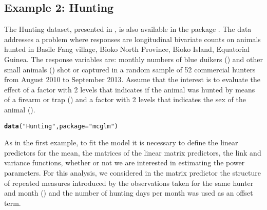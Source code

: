 \documentclass[article]{jss}\usepackage[]{graphicx}\usepackage[]{xcolor}
\makeatletter
\newcommand{\hlstr}[1]{\textcolor[rgb]{0.192,0.494,0.8}{#1}}%
\newcommand{\hlstd}[1]{\textcolor[rgb]{0.345,0.345,0.345}{#1}}%
\newcommand{\hlkwc}[1]{\textcolor[rgb]{0.333,0.667,0.333}{#1}}%
\newcommand{\hlkwd}[1]{\textcolor[rgb]{0.737,0.353,0.396}{\textbf{#1}}}%
\newenvironment{kframe}{%
 \def\at@end@of@kframe{}%
 \ifinner\ifhmode%
  \def\at@end@of@kframe{\end{minipage}}%
  \begin{minipage}{\columnwidth}%
 \fi\fi%
 \def\FrameCommand##1{\hskip\@totalleftmargin \hskip-\fboxsep
 \colorbox{shadecolor}{##1}\hskip-\fboxsep
     \hskip-\linewidth \hskip-\@totalleftmargin \hskip\columnwidth}%
 \MakeFramed {\advance\hsize-\width
   \@totalleftmargin\z@ \linewidth\hsize
   \@setminipage}}%
 {\par\unskip\endMakeFramed%
 \at@end@of@kframe}
\newenvironment{knitrout}{}{} %
\makeatother
\begin{document}
\subsection{Example 2: Hunting}

The Hunting dataset, presented in \citet{hunting}, is also available in the package . The data addresses a problem where responses are longitudinal bivariate counts on animals hunted in Basile Fang village, Bioko North Province, Bioko Island, Equatorial Guinea. The response variables are: monthly numbers of blue duikers () and other small animals () shot or captured in a random sample of 52 commercial hunters from August 2010 to September 2013. Assume that the interest is to evaluate the effect of a factor with 2 levels that indicates if the animal was hunted by means of a firearm or trap () and a factor with 2 levels that indicates the sex of the animal ().

\begin{knitrout}
\color{fgcolor}\begin{kframe}
\begin{alltt}
\hlkwd{data}\hlstd{(}\hlstr{"Hunting"}\hlstd{,} \hlkwc{package} \hlstd{=} \hlstr{"mcglm"}\hlstd{)}
\end{alltt}
\end{kframe}
\end{knitrout}

As in the first example, to fit the model it is necessary to define the linear predictors for the mean, the matrices of the linear matrix predictors, the link and variance functions, whether or not we are interested in estimating the power parameters. For this analysis, we considered in the matrix predictor the structure of repeated measures introduced by the observations taken for the same hunter and month () and the number of hunting days per month was used as an offset term.
\end{document}
